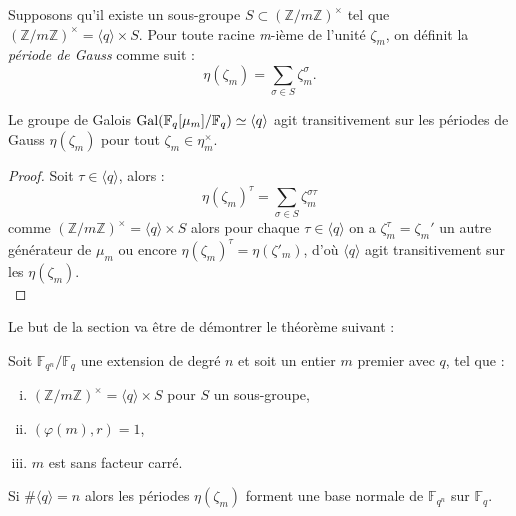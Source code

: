 \documentclass[a4paper]{article} %
\numberwithin{section}{part}
\numberwithin{equation}{section}
\newcommand\nroot[1]{\textit{#1}-ième}
\newcommand\zmodninv[1]{(\mathbb{Z}/#1\mathbb{Z})^{\times}}
\newcommand\GF[1]{\mathbb{F}_{#1}}
\newcommand\etmath{\textup{\quad et \quad}}
\newcommand\groupgen[1]{\langle{#1}\rangle}
\begin{document}
\iffalse
\begin{equation}
\#G/\groupgen{q}=g\etmath\#\groupgen{q} = f = [K[\mu_m]:K]/g.
\end{equation}
\fi

\begin{defn}
Supposons qu'il existe un sous-groupe $S\subset\zmodninv{m}$ tel que
$\zmodninv{m} = \groupgen{q}\times S$. Pour toute racine \nroot{m} de
l'unité $\zeta_m$, on définit la \emph{période de Gauss} comme suit :
\begin{equation}
\eta(\zeta_m) = \sum_{\sigma\in S}{\zeta_m^{\sigma}}.
\end{equation}
\end{defn}
\begin{prop}
\label{prop:gaussperconj}
Le groupe de Galois $\textup{Gal}(\GF{q}[\mu_m]/\GF{q})\simeq\groupgen{q}$
agit transitivement sur les périodes de Gauss $\eta(\zeta_m)$ pour tout
$\zeta_m\in\eta_m^{\times}$.
\end{prop}
\begin{proof}
Soit $\tau\in\groupgen{q}$, alors :
\begin{equation}
\eta(\zeta_m)^{\tau} = \sum_{\sigma\in S}{\zeta_m^{\sigma\tau}}
\end{equation}
comme $\zmodninv{m} = \groupgen{q}\times S$ alors pour chaque
$\tau\in\groupgen{q}$ on a $\zeta_m^{\tau} = \zeta_m'$ un autre générateur
de $\mu_m$ ou encore $\eta(\zeta_m)^{\tau} = \eta(\zeta'_m)$, d'où
$\groupgen{q}$ agit transitivement sur les $\eta(\zeta_m)$.\\
\end{proof}
Le but de la section va être de démontrer le théorème suivant :

\begin{thm}
\label{th:gausspernorm}
Soit $\GF{q^n}/\GF{q}$ une extension de degré $n$ et soit un entier $m$ premier 
avec $q$, tel que :
\vspace{0.3cm}
\begin{enumerate}[(i)]
    \item $\zmodninv{m} = \groupgen{q}\times S$ pour $S$ un sous-groupe,
    \item $(\varphi(m), r) = 1$,
    \item $m$ est sans facteur carré.
\end{enumerate}
\vspace{0.3cm}
Si $\#\groupgen{q} = n$ alors les périodes $\eta(\zeta_m)$ forment une base
normale de $\GF{q^n}$ sur $\GF{q}$.
\end{thm}
\end{document}
